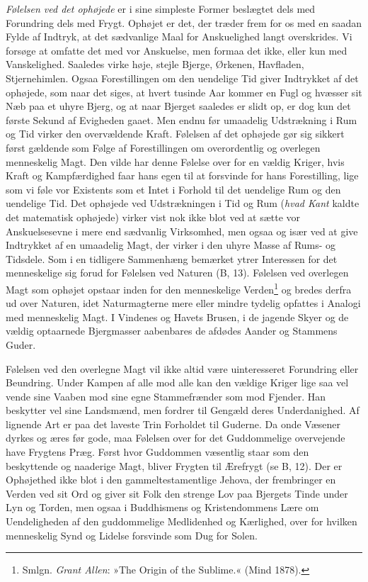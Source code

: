 \documentclass[12pt,a4paper,openany]{book}
\newcommand{\opage}[1]{\marginnote{\footnotesize\textit{[#1]}}}
\begin{document}
\emph{Følelsen ved det ophøjede} er i sine simpleste Former beslægtet
dels med Forundring dels med Frygt. Ophøjet er det, der træder frem for
os med en saadan Fylde af Indtryk, at det sædvanlige Maal for
Anskuelighed langt overskrides. Vi forsøge at omfatte det med vor
Anskuelse, men formaa det ikke, eller kun med Vanskelighed. Saaledes
virke høje, stejle Bjerge, Ørkenen, Havfladen, Stjernehimlen. Ogsaa
Forestillingen om den uendelige Tid giver Indtrykket af det ophøjede,
som naar det siges, at hvert tusinde Aar kommer en Fugl og hvæsser sit
Næb paa et uhyre Bjerg, og at naar Bjerget saaledes er slidt op, er dog
kun det første Sekund af Evigheden gaaet. Men endnu før umaadelig
Udstrækning i Rum og Tid virker den overvældende Kraft. Følelsen af det
ophøjede gør sig sikkert først gældende som Følge af Forestillingen om
overordentlig og overlegen menneskelig Magt. Den vilde har denne Følelse
over for en vældig Kriger, hvis Kraft og Kampfærdighed faar hans egen
til at forsvinde for hans Forestilling, lige som vi føle vor Existents
som et Intet i Forhold til det uendelige Rum og den uendelige Tid. Det
ophøjede ved Udstrækningen i Tid og Rum (\emph{hvad Kant} kaldte det
matematisk ophøjede) virker vist nok ikke blot ved at sætte vor
Anskuelsesevne i mere end sædvanlig Virksomhed, men ogsaa og især ved at
give Indtrykket af en umaadelig
\opage{342}Magt, der virker i den uhyre Masse af Rums- og Tidsdele. Som
i en tidligere Sammenhæng bemærket ytrer Interessen for det menneskelige
sig forud for Følelsen ved Naturen (B, 13). Følelsen ved overlegen Magt
som ophøjet opstaar inden for den menneskelige Verden\footnote[1]{Smlgn. \emph{Grant Allen}: »The Origin of the Sublime.« (Mind 1878).} og bredes
derfra ud over Naturen, idet Naturmagterne mere eller mindre tydelig
opfattes i Analogi med menneskelig Magt. I Vindenes og Havets Brusen, i
de jagende Skyer og de vældig optaarnede Bjergmasser aabenbares de
afdødes Aander og Stammens Guder.

Følelsen ved den overlegne Magt vil ikke altid være uinteresseret
Forundring eller Beundring. Under Kampen af alle mod alle kan den
vældige Kriger lige saa vel vende sine Vaaben mod sine egne
Stammefrænder som mod Fjender. Han beskytter vel sine Landsmænd, men
fordrer til Gengæld deres Underdanighed. Af lignende Art er paa det
laveste Trin Forholdet til Guderne. Da onde Væsener dyrkes og æres før
gode, maa Følelsen over for det Guddommelige overvejende have Frygtens
Præg. Først hvor Guddommen væsentlig staar som den beskyttende og
naaderige Magt, bliver Frygten til Ærefrygt (se B, 12). Der er
Ophøjethed ikke blot i den gammeltestamentlige Jehova, der frembringer
en Verden ved sit Ord og giver sit Folk den strenge Lov paa Bjergets
Tinde under Lyn og Torden, men ogsaa i Buddhismens og Kristendommens
Lære om Uendeligheden af den guddommelige Medlidenhed og Kærlighed, over
for hvilken menneskelig Synd og Lidelse forsvinde som Dug for Solen.
\end{document}
